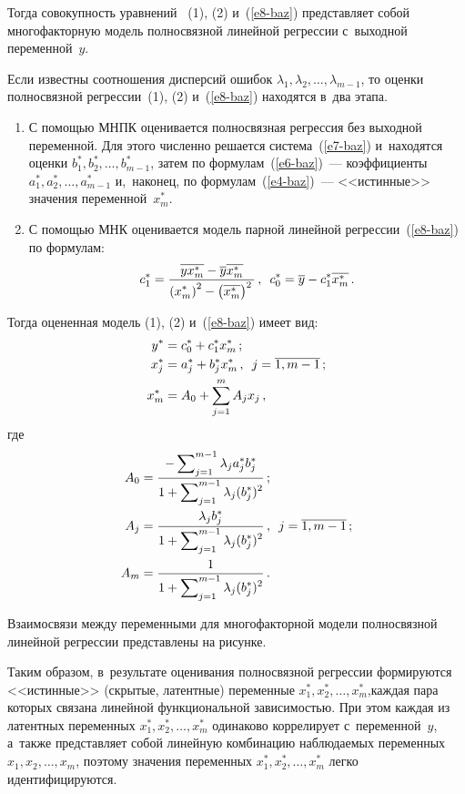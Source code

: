 \begin{multicols}{2}
    Тогда совокупность уравнений~ (1), (2) и~(\ref{e8-baz}) представляет 
собой многофакторную модель полносвязной линейной регрессии с~выходной 
переменной~$y$.
    
    Если известны соотношения дисперсий ошибок $\lambda_1, \lambda_2, 
\ldots , \lambda_{m-1}$, то оценки полносвязной регрессии~(1), (2) 
и~(\ref{e8-baz}) находятся в~два этапа.
    \begin{enumerate}[1.]
\item С помощью МНПК оценивается полносвязная регрессия без 
выходной переменной. Для этого численно решается система~(\ref{e7-baz}) 
и~находятся оценки $b_1^*, b_2^*, \ldots , b^*_{m-1}$, затем по 
формулам~(\ref{e6-baz})~--- коэффициенты $a_1^*, a_2^*, \ldots , a^*_{m-1}$ 
и,~наконец, по формулам~(\ref{e4-baz})~--- <<истинные>> значения 
переменной~$x_m^*$.
\item С помощью МНК оценивается модель парной линейной 
регрессии~(\ref{e8-baz}) по формулам:
\begin{equation*}
c_1^* = \displaystyle\frac{\displaystyle \overline{yx_m^*}-\overline{y}\overline{x_m^*}\mathstrut}{\displaystyle \left(x_m^*\right)^2-\left(\overline{x_m^*}\right)^2\mathstrut}\,,\enskip 
c_0^*=\overline{y}-c_1^* \overline{x_m^*}\,.
\end{equation*}
    \end{enumerate}
    
Тогда оцененная модель (1), (2) и~(\ref{e8-baz}) имеет вид:
\begin{align} 
y^* &= c_0^* +c_1^* x_m^*\,;\notag%
\\
x_j^* &=a_j^*+b_j^* x_m^*\,,\enskip j=\overline{1,m-1}\,;\notag%
\\
x_m^* &= A_0+\sum\limits^m_{j=1} A_j x_j\,, \label{e12-baz}
\end{align}
где 
\begin{align*}
A_0&= \displaystyle\frac{\displaystyle -\sum\nolimits_{j=1}^{m-1} \lambda_j a_j^* b_j^*\mathstrut}{\displaystyle 1+\sum\nolimits_{j=1}^{m-1}\lambda_j(b_j^*)^2\mathstrut}\,;\\
A_j&= \displaystyle\frac{\displaystyle \lambda_j b_j^*\mathstrut}{\displaystyle 1+\sum\nolimits^{m-1}_{j=1}\lambda_j 
(b_j^*)^2\mathstrut}\,,\enskip j=\overline{1,m-1}\,;\\
A_m&= \displaystyle\frac{\displaystyle 1\mathstrut}{\displaystyle 1+\sum\nolimits^{m-1}_{j=1}\lambda_j (b_j^*)^2\mathstrut}\,.
\end{align*}

    Взаимосвязи между переменными для многофакторной модели 
полносвязной линейной регрессии представлены на рисунке.
    

     
    Таким образом, в~результате оценивания полносвязной регрессии 
формируются <<истинные>> (скрытые, латентные) переменные $x_1^*, x_2^*, 
\ldots , x_m^*$,\linebreak каждая пара которых связана линейной функциональной 
зависимостью. При этом каждая из латентных переменных $x_1^*, x_2^*, \ldots 
, x_m^*$ одинаково коррелирует с~переменной~$y$, а~также представляет\linebreak 
собой линейную комбинацию наблюдаемых переменных $x_1, x_2, \ldots, 
x_m$, поэтому значения переменных $x_1^*, x_2^*, \ldots , x_m^*$ легко 
идентифицируются.


\end{multicols}
